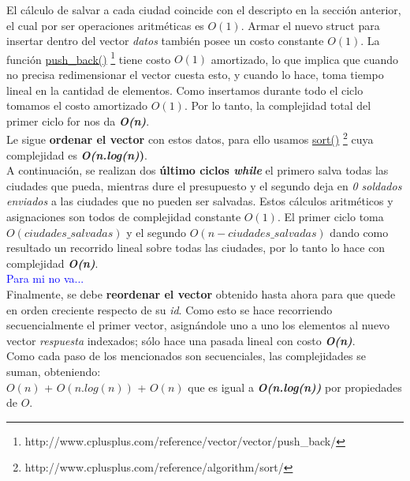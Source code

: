 El c\'alculo de salvar a cada ciudad coincide con el descripto en la secci\'on anterior, el cual por ser operaciones aritm\'eticas es $O(1)$. Armar el nuevo struct para insertar dentro del vector \emph{datos} tambi\'en posee un costo constante $O(1)$. La funci\'on \href{http://www.cplusplus.com/reference/vector/vector/push_back/}{push\_back()} \footnote{http://www.cplusplus.com/reference/vector/vector/push_back/} tiene costo $O(1)$ amortizado, lo que implica que cuando no precisa redimensionar el vector cuesta esto, y cuando lo hace, toma tiempo lineal en la cantidad de elementos. Como insertamos durante todo el ciclo tomamos el costo amortizado $O(1)$.
Por lo tanto, la complejidad total del primer ciclo for nos da \textbf{\textit{O(n)}}.\\

Le sigue \textbf{ordenar el vector} con estos datos, para ello usamos \href{http://www.cplusplus.com/reference/algorithm/sort/}{sort()} \footnote{http://www.cplusplus.com/reference/algorithm/sort/} cuya complejidad es \textbf{\textit{O(n.log(n)})}.\\

A continuaci\'on, se realizan dos \textbf{\'ultimo ciclos \emph{while}} el primero salva todas las ciudades que pueda, mientras dure el presupuesto y el segundo deja en \emph{0 soldados enviados} a las ciudades que no pueden ser salvadas. Estos c\'alculos aritm\'eticos y asignaciones son todos de complejidad constante $O(1)$. El primer ciclo toma $O(ciudades\_salvadas)$ y el segundo $O(n-ciudades\_salvadas)$ dando como resultado un recorrido lineal sobre todas las ciudades, por lo tanto lo hace con complejidad \textbf{\textit{O(n)}}.\\

\textcolor{blue}{Para mi no va...}\\

Finalmente, se debe \textbf{reordenar el vector} obtenido hasta ahora para que quede en orden creciente respecto de su \textit{id}. Como esto se hace recorriendo secuencialmente el primer vector, asign\'andole uno a uno los elementos al nuevo vector \emph{respuesta} indexados; s\'olo hace una pasada lineal con costo \textbf{\textit{O(n)}}.\\

Como cada paso de los mencionados son secuenciales, las complejidades se suman, obteniendo:\\

$O(n)$ + $O(n.log(n))$ + $O(n)$ 
 que es igual a \textit{\textbf{O(n.log(n))}} por propiedades de $O$.


